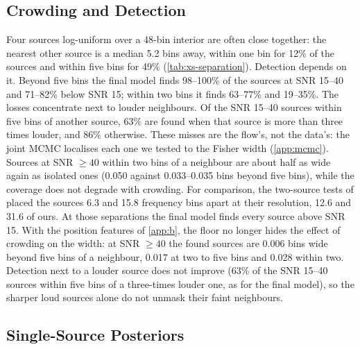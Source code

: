\subsection{Crowding and Detection}
\label{app:xs-crowding}

Four sources log-uniform over a 48-bin interior are often close together: the nearest other
source is a median 5.2 bins away, within one bin for 12\% of the sources and within five bins
for 49\% (\cref{tab:xs-separation}). Detection depends on it. Beyond five bins the final model
finds 98--100\% of the sources at SNR 15--40 and 71--82\% below SNR 15; within two bins it finds
63--77\% and 19--35\%. The losses concentrate next to louder neighbours. Of the SNR 15--40
sources within five bins of another source, 63\% are found when that source is more than three
times louder, and 86\% otherwise. These misses are the flow's, not the data's: the joint MCMC
localises each one we tested to the Fisher width (\cref{app:mcmc}). Sources at SNR $\ge40$ within two bins of a neighbour are about half as wide again as isolated
ones (0.050 against 0.033--0.035
bins beyond five bins), while the coverage does not degrade with crowding. For comparison, the
two-source tests of \citet{delmond2026neural} placed the sources 6.3 and 15.8 frequency bins
apart at their resolution, 12.6 and 31.6 of ours. At those separations the final model finds
every source above SNR 15. With the position features of \cref{app:b}, the floor no
longer hides the effect of crowding on the width: at SNR $\ge40$ the found sources are 0.006
bins wide beyond five bins of a neighbour, 0.017 at two to five bins and 0.028 within two.
Detection next to a louder source does not improve (63\% of the SNR 15--40 sources within
five bins of a three-times louder one, as for the final model), so the sharper loud sources
alone do not unmask their faint neighbours.

\begin{table}[h]
\caption{The final model by the distance from each source to the nearest other source in its
window, in bins, on the 840 scored sources. Found fractions by SNR band; the width and its
ratio to the ideal are medians over found sources at SNR $\ge40$; coverage over all sources in
the row.}
\label{tab:xs-separation}
\centering
\small

\end{table}

\subsection{Single-Source Posteriors}


